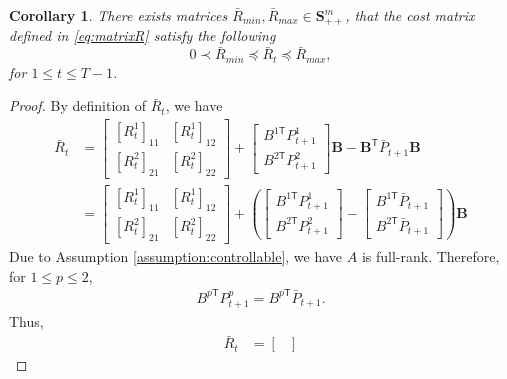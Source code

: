 \documentclass{article}
\newcommand{\transpose}{\mathsf{T}}
\newtheorem{corollary}{Corollary}
\begin{document}
\begin{corollary}
    There exists matrices $\bar{R}_{min},\bar{R}_{max} \in \mathbf{S}_{++}^{m}$, that the cost matrix defined in \eqref{eq:matrixR} satisfy the following
    \begin{equation}
        0 \prec \bar{R}_{min} \preceq \bar{R}_{t} \preceq \bar{R}_{max},
    \end{equation}
    for $1\leq t \leq T-1$.
\end{corollary}
\begin{proof}
    By definition of $\bar{R}_{t}$, we have
    \begin{align*}
        \bar{R}_{t} &= 
        \begin{bmatrix}
            [R_{t}^{1}]_{11} & [R_{t}^{1}]_{12}\\
            [R_{t}^{2}]_{21} & [R_{t}^{2}]_{22}
        \end{bmatrix}
        + 
        \begin{bmatrix}
            B^{1\transpose}P_{t+1}^{1}\\
            B^{2\transpose}P_{t+1}^{2}
        \end{bmatrix}\mathbf{B}
        - \mathbf{B}^{\transpose}\bar{P}_{t+1}\mathbf{B}\\
        &= \begin{bmatrix}
            [R_{t}^{1}]_{11} & [R_{t}^{1}]_{12}\\
            [R_{t}^{2}]_{21} & [R_{t}^{2}]_{22}
        \end{bmatrix}
        + 
        (\begin{bmatrix}
            B^{1\transpose}P_{t+1}^{1}\\
            B^{2\transpose}P_{t+1}^{2}
        \end{bmatrix}-
        \begin{bmatrix}
            B^{1\transpose}\bar{P}_{t+1}\\
            B^{2\transpose}\bar{P}_{t+1}
        \end{bmatrix}
        )\mathbf{B}
    \end{align*}
    Due to Assumption \ref{assumption:controllable}, we have $A$ is full-rank. Therefore, for $1\leq p \leq 2$,
    \begin{align*}
        B^{p\transpose}P_{t+1}^{p} = B^{p\transpose}\bar{P}_{t+1}.
    \end{align*}
    Thus,
    \begin{align*}
        \bar{R}_{t} &= 
        \begin{bmatrix}

\end{bmatrix}
\end{align*}
\end{proof}
\end{document}
